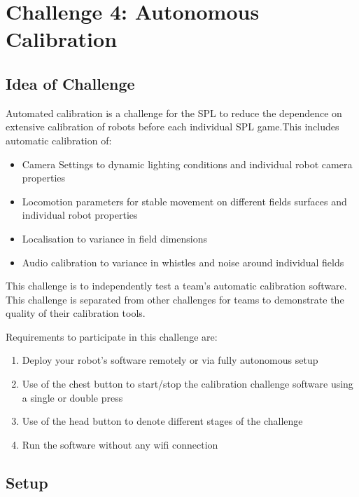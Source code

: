 \section{Challenge 4: Autonomous Calibration}
\label{sec:AutonmousCalibration}

\subsection{Idea of Challenge}

Automated calibration is a challenge for the SPL to reduce the dependence on extensive calibration of robots before each individual SPL game.This includes automatic calibration of:
\begin{itemize}
    \item Camera Settings to dynamic lighting conditions and individual robot camera properties
    \item Locomotion parameters for stable movement on different fields surfaces and individual robot properties
    \item Localisation to variance in field dimensions
    \item Audio calibration to variance in whistles and noise around individual fields
\end{itemize}

This challenge is to independently test a team's automatic calibration software. This challenge is separated from other challenges for teams to demonstrate the quality of their calibration tools.

Requirements to participate in this challenge are:
\begin{enumerate}
    \item Deploy your robot's software remotely or via fully autonomous setup
    \item Use of the chest button to start/stop the calibration challenge software using a single or double press
    \item Use of the head button to denote different stages of the challenge
    \item Run the software without any wifi connection
\end{enumerate}

\subsection{Setup}

